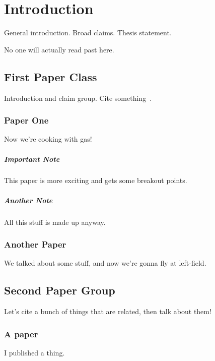 



\chapter{Introduction}

General introduction. Broad claims. Thesis statement.

No one will actually read past here.

\section{First Paper Class}

Introduction and claim group. Cite something~\cite{censys}.

\subsection{Paper One}

Now we're cooking with gas!

\paragraph{Important Note}
This paper is more exciting and gets some breakout points.

\paragraph{Another Note}
All this stuff is made up anyway.

\subsection{Another Paper}

We talked about some stuff, and now we're gonna fly at left-field.

\section{Second Paper Group}

Let's cite a bunch of things that are related, then talk about them!

\subsection{A paper}

I published a thing.

